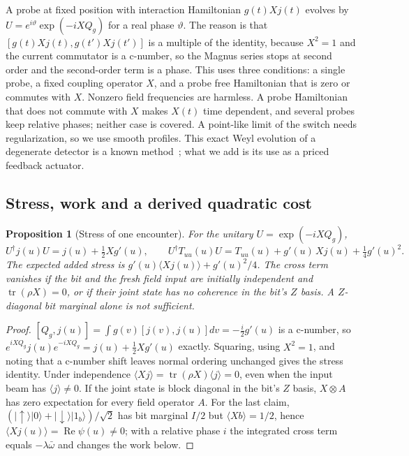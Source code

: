 \documentclass[aps,pre,onecolumn,superscriptaddress,floatfix,longbibliography]{revtex4-2}
\newtheorem{proposition}[theorem]{Proposition}
\begin{document}
A probe at fixed position with interaction Hamiltonian $g(t)Xj(t)$ evolves by $U=e^{i\vartheta}\exp(-iXQ_g)$ for a real phase $\vartheta$. The reason is that $[g(t)Xj(t),g(t')Xj(t')]$ is a multiple of the identity, because $X^2=1$ and the current commutator is a c-number, so the Magnus series stops at second order and the second-order term is a phase. This uses three conditions: a single probe, a fixed coupling operator $X$, and a probe free Hamiltonian that is zero or commutes with $X$. Nonzero field frequencies are harmless. A probe Hamiltonian that does not commute with $X$ makes $X(t)$ time dependent, and several probes keep relative phases; neither case is covered. A point-like limit of the switch needs regularization, so we use smooth profiles. This exact Weyl evolution of a degenerate detector is a known method~\cite{Landulfo2016,Cozzella2020}; what we add is its use as a priced feedback actuator.

\subsection{Stress, work and a derived quadratic cost}
\label{sec:stress}

\begin{proposition}[Stress of one encounter]
\label{prop:stress}
For the unitary $U=\exp(-iXQ_g)$,
\begin{equation}
U^\dagger j(u)U=j(u)+\tfrac12Xg'(u),\qquad
U^\dagger T_{uu}(u)U=T_{uu}(u)+g'(u)\,X j(u)+\tfrac14g'(u)^2 .
\label{eq:stress}
\end{equation}
The expected added stress is $g'(u)\langle Xj(u)\rangle+g'(u)^2/4$. The cross term vanishes if the bit and the fresh field input are initially independent and $\operatorname{tr}(\rho X)=0$, or if their joint state has no coherence in the bit's $Z$ basis. A $Z$-diagonal bit marginal alone is not sufficient.
\end{proposition}

\begin{proof}
$[Q_g,j(u)]=\int g(v)[j(v),j(u)]dv=-\tfrac i2g'(u)$ is a c-number, so $e^{iXQ_g}j(u)e^{-iXQ_g}=j(u)+\tfrac12Xg'(u)$ exactly. Squaring, using $X^2=1$, and noting that a c-number shift leaves normal ordering unchanged gives the stress identity. Under independence $\langle Xj\rangle=\operatorname{tr}(\rho X)\langle j\rangle=0$, even when the input beam has $\langle j\rangle\ne0$. If the joint state is block diagonal in the bit's $Z$ basis, $X\otimes A$ has zero expectation for every field operator $A$. For the last claim, $(|{\uparrow}\rangle|0\rangle+|{\downarrow}\rangle|1_b\rangle)/\sqrt2$ has bit marginal $I/2$ but $\langle Xb\rangle=1/2$, hence $\langle Xj(u)\rangle=\operatorname{Re}\psi(u)\ne0$; with a relative phase $i$ the integrated cross term equals $-\lambda\bar\omega$ and changes the work below.
\end{proof}
\end{document}
